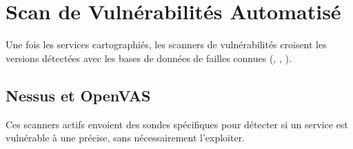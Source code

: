 \section{Scan de Vulnérabilités Automatisé}
\label{sec:vuln_scan}

Une fois les services cartographiés, les scanners de vulnérabilités croisent
les versions détectées avec les bases de données de failles connues (,
, ).

\subsection{Nessus et OpenVAS}
\label{subsec:nessus}

Ces scanners actifs envoient des sondes spécifiques pour détecter si un
service est vulnérable à une  précise, sans nécessairement
l'exploiter.

